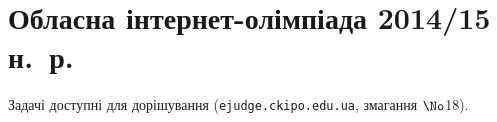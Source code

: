 
\section{Обласна інтернет-олімпіада 2014/15 н.~р.}

Задачі доступні для дорішування (\verb"ejudge.ckipo.edu.ua", змагання $\No$18).

\renewenvironment{problemAllDefault}[1]{\vspace{10mm}\par\begin{problem}{#1}{Клавіатура (stdin)}{Екран (stdout)}{1 сек}{64 мегабайти}}{\end{problem}}

	

	

	


